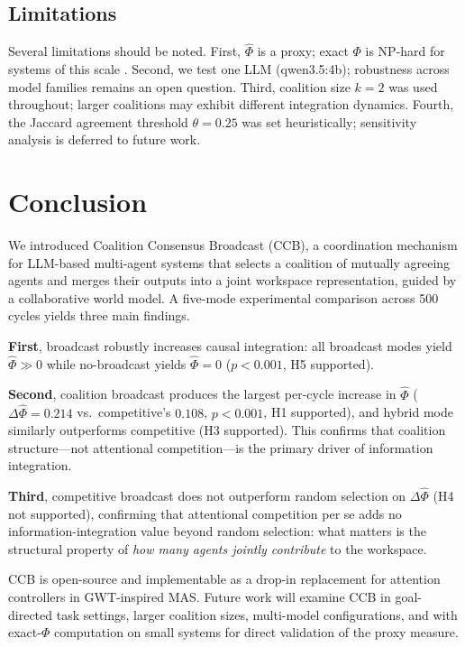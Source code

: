 \documentclass[11pt]{article}
\theoremstyle{definition}
\begin{document}
\subsection{Limitations}

Several limitations should be noted. First, $\hat{\Phi}$ is a proxy; exact $\Phi$ is
NP-hard for systems of this scale \citep{barrett2026}. Second, we test one LLM (qwen3.5:4b);
robustness across model families remains an open question. Third, coalition size $k = 2$
was used throughout; larger coalitions may exhibit different integration dynamics. Fourth,
the Jaccard agreement threshold $\theta = 0.25$ was set heuristically; sensitivity analysis
is deferred to future work.


\section{Conclusion}
\label{sec:conclusion}

We introduced Coalition Consensus Broadcast (CCB), a coordination mechanism for LLM-based
multi-agent systems that selects a coalition of mutually agreeing agents and merges their
outputs into a joint workspace representation, guided by a collaborative world model.
A five-mode experimental comparison across 500 cycles yields three main findings.

\textbf{First}, broadcast robustly increases causal integration: all broadcast modes
yield $\hat{\Phi} \gg 0$ while no-broadcast yields $\hat{\Phi} = 0$ ($p < 0.001$,
H5 supported).

\textbf{Second}, coalition broadcast produces the largest per-cycle increase in
$\hat{\Phi}$ ($\Delta\hat{\Phi} = 0.214$ vs.\ competitive's $0.108$, $p < 0.001$,
H1 supported), and hybrid mode similarly outperforms competitive (H3 supported). This
confirms that coalition structure---not attentional competition---is the primary driver
of information integration.

\textbf{Third}, competitive broadcast does not outperform random selection on
$\Delta\hat{\Phi}$ (H4 not supported), confirming that attentional competition per se
adds no information-integration value beyond random selection: what matters is the
structural property of \textit{how many agents jointly contribute} to the workspace.

CCB is open-source and implementable as a drop-in replacement for attention controllers in
GWT-inspired MAS. Future work will examine CCB in goal-directed task settings, larger coalition
sizes, multi-model configurations, and with exact-$\Phi$ computation on small systems for
direct validation of the proxy measure.
\end{document}
